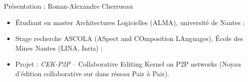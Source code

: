 \begin{frame}{Pr\'esentation : Ronan-Alexandre Cherrueau}
\begin{itemize}
  \item Étudiant en master Architectures Logicielles (ALMA), université de
  Nantes ;
  \item Stage recherche ASCOLA (ASpect and COmposition LAnguages), École des
  Mines Nantes (LINA, Inria) ;
  \item Projet : \emph{CEK-P2P} -- Collaborative Editing Kernel on P2P networks
  (Noyau d'édition collaborative sur dans réseau Pair à Pair).
\end{itemize}
\end{frame}

